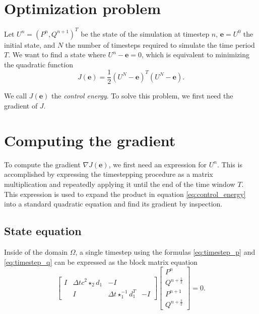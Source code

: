 \documentclass[utf8,english]{gradu3}
\begin{document}
\section{Optimization problem}

Let $U^n = (P^n, Q^{n+1})^T$ be the state of the simulation at timestep $n$,
$\mathbf{e} = U^0$ the initial state, and $N$ the number of timesteps
required to simulate the time period $T$.
We want to find a state where $U^n - \mathbf{e} = 0$,
which is equivalent to minimizing the quadratic function
\begin{equation}\label{eq:control_energy}
  J(\mathbf{e}) = \frac{1}{2}(U^N - \mathbf{e})^T (U^N - \mathbf{e}).
\end{equation}

We call $J(\mathbf{e})$ the \textit{control energy}.
To solve this problem, we first need the gradient of $J$.


\section{Computing the gradient}

To compute the gradient $\nabla J(\mathbf{e})$,
we first need an expression for $U^n$.
This is accomplished by expressing the timestepping procedure
as a matrix multiplication and repeatedly applying it
until the end of the time window $T$.
This expression is used to expand the product in equation \eqref{eq:control_energy}
into a standard quadratic equation and find its gradient by inspection.


\subsection{State equation}

Inside of the domain $\Omega$, a single timestep
using the formulas \eqref{eq:timestep_p} and \eqref{eq:timestep_q}
can be expressed as the block matrix equation
\[
  \begin{bmatrix}
  I & \Delta t c^2 \star_2 d_1 & -I \\
  & I & \Delta t \star_1^{-1} d_1^T & -I
  \end{bmatrix}
  \begin{bmatrix}
  P^n \\ Q^{n+\frac{1}{2}} \\ P^{n+1} \\ Q^{n+\frac{3}{2}}
  \end{bmatrix}
  = 0.
\]
\end{document}
